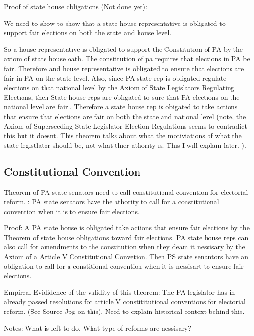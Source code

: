 \documentclass[11pt]{article} %
\begin{document}
\begin{enumerate}
Proof of state house obligations (Not done yet):

We need to show to show that a state house representative is obligated to support fair elections on both the state and house level. 

So a house representative is obligated to support the Constitution of PA by the axiom of state house oath.  The constitution of pa requires that elections in PA be fair.  Therefore and house representative is obligated to ensure that elections are fair in PA on the state level.  Also, since PA state rep is obligated regulate elections on that national level by the Axiom of State Legislators Regulating Elections, then State house reps are obligated to sure that PA elections on the national level are fair . Therefore a state house rep is obigated to take actions that ensure that elections are fair on both the state and national level (note, the Axiom of Superseeding State Legislator Election Regulations seems to contradict this but it doesnt.  This theorem talks about what the motiviations of what the state legistlator should be, not what thier athority is.  This I will explain later. ). 


\subsection{Constitutional Convention}

Theorem of  PA state senators need to call constitutional convention for electorial reform. : PA state senators have the athority to call for a constitutional convention when it is to ensure fair elections.

Proof:  A PA state house is obligated take actions that ensure fair elections by the Theorem of state house obligations toward fair elections.  PA state house reps can also call for amendments to the constitution when they deam it nessisary by the Axiom of a Article V Constitutional Convetion.  Then PS state senantors have an obligation to call for a constitional convention when it is nessisart to ensure fair elections. 

Empircal Evididence of the validity of this theorem:   The PA legislator has in already passed resolutions for article V constititutional conventions for electorial reform.   (See Source Jpg on this).   Need to explain historical context behind this. 



Notes: What is left to do.  What type of reforms are nessisary?  


\end{enumerate}
\end{document}
